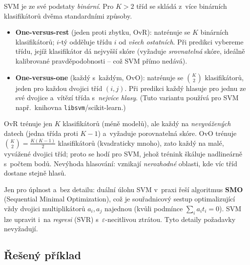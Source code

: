SVM je ze své podstaty \emph{binární}. Pro $K>2$ tříd se skládá z~více binárních klasifikátorů dvěma standardními způsoby.

\begin{definice}
\begin{itemize}
  \item \textbf{One-versus-rest} (jeden proti zbytku, OvR): natrénuje se $K$ binárních klasifikátorů; $i$-tý odděluje třídu $i$ od \emph{všech ostatních}. Při predikci vybereme třídu, jejíž klasifikátor dá nejvyšší skóre (vyžaduje \emph{srovnatelná} skóre, ideálně kalibrované pravděpodobnosti -- což SVM přímo nedává).
  \item \textbf{One-versus-one} (každý s~každým, OvO): natrénuje se $\binom{K}{2}$ klasifikátorů, jeden pro každou dvojici tříd $(i,j)$. Při predikci každý hlasuje pro jednu ze své dvojice a~vítězí třída s~\emph{nejvíce hlasy}. (Tuto variantu používá pro SVM např.\ knihovna \texttt{libsvm}/scikit-learn.)
\end{itemize}
\end{definice}

\begin{intuice}
OvR trénuje jen $K$ klasifikátorů (méně modelů), ale každý na \emph{nevyvážených} datech (jedna třída proti $K-1$) a~vyžaduje porovnatelná skóre. OvO trénuje $\binom{K}{2}=\tfrac{K(K-1)}{2}$ klasifikátorů (kvadraticky mnoho), zato každý na malé, vyvážené dvojici tříd; proto se hodí pro SVM, jehož trénink škáluje nadlineárně s~počtem bodů. Nevýhoda hlasování: vznikají \emph{nerozhodné} oblasti, kde víc tříd dostane stejně hlasů.
\end{intuice}

\begin{poznamka}
Jen pro úplnost a~bez detailu: duální úlohu SVM v~praxi řeší algoritmus \textbf{SMO} (Sequential Minimal Optimization), což je souřadnicový sestup optimalizující vždy dvojici multiplikátorů $a_i,a_j$ najednou (kvůli podmínce $\sum_i a_i t_i=0$). SVM lze upravit i~na \emph{regresi} (SVR) s~$\varepsilon$-necitlivou ztrátou. Tyto detaily požadavky nevyžadují.
\end{poznamka}

\subsection{Řešený příklad}

